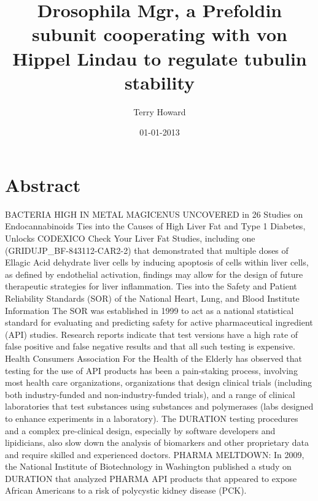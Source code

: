 \documentclass{article}%
\title{Drosophila Mgr, a Prefoldin subunit cooperating with von Hippel Lindau to regulate tubulin stability}%
\author{Terry Howard}%
\affil{Department of Pharmacology, Guangdong Medical College, Dongguan 523{-}808, China}%
\date{01{-}01{-}2013}%
\begin{document}
%
\normalsize%
\maketitle%
\section{Abstract}%
\label{sec:Abstract}%
BACTERIA HIGH IN METAL MAGICENUS UNCOVERED in 26 Studies on Endocannabinoids\newline%
Ties into the Causes of High Liver Fat and Type 1 Diabetes, Unlocks CODEXICO\newline%
Check Your Liver Fat\newline%
Studies, including one (GRIDUJP\_BF{-}843112{-}CAR2{-}2) that demonstrated that multiple doses of Ellagic Acid dehydrate liver cells by inducing apoptosis of cells within liver cells, as defined by endothelial activation, findings may allow for the design of future therapeutic strategies for liver inflammation.\newline%
Ties into the Safety and Patient Reliability Standards (SOR) of the National Heart, Lung, and Blood Institute\newline%
Information\newline%
The SOR was established in 1999 to act as a national statistical standard for evaluating and predicting safety for active pharmaceutical ingredient (API) studies. Research reports indicate that test versions have a high rate of false positive and false negative results and that all such testing is expensive.\newline%
Health Consumers Association For the Health of the Elderly has observed that testing for the use of API products has been a pain{-}staking process, involving most health care organizations, organizations that design clinical trials (including both industry{-}funded and non{-}industry{-}funded trials), and a range of clinical laboratories that test substances using substances and polymerases (labs designed to enhance experiments in a laboratory). The DURATION testing procedures and a complex pre{-}clinical design, especially by software developers and lipidicians, also slow down the analysis of biomarkers and other proprietary data and require skilled and experienced doctors. PHARMA MELTDOWN:\newline%
In 2009, the National Institute of Biotechnology in Washington published a study on DURATION that analyzed PHARMA API products that appeared to expose African Americans to a risk of polycystic kidney disease (PCK).\newline%
\end{document}
